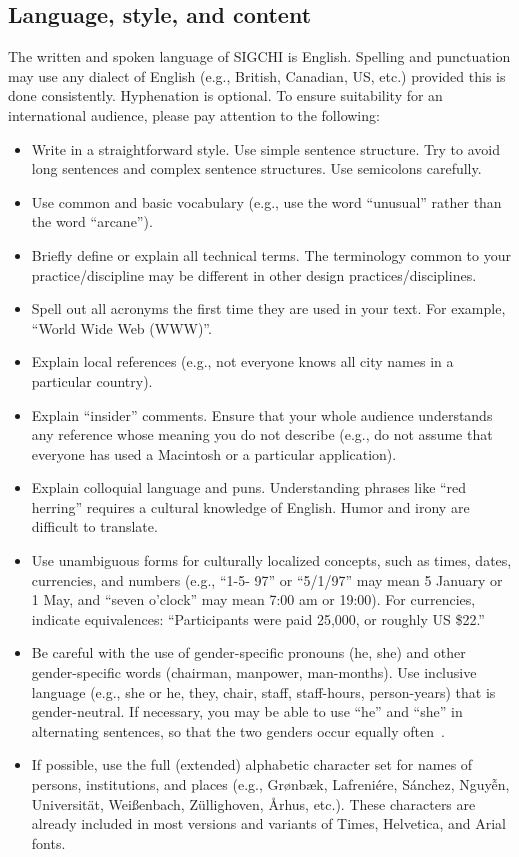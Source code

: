 \documentclass[sigchi-a, authorversion]{acmart}
\begin{document}
\subsection{Language, style, and content}
The written and spoken language of SIGCHI is English. Spelling and
punctuation may use any dialect of English (e.g., British, Canadian,
US, etc.) provided this is done consistently. Hyphenation is
optional. To ensure suitability for an international audience, please
pay attention to the following:
\begin{itemize}
\item Write in a straightforward style. Use simple sentence
  structure. Try to avoid long sentences and complex sentence
  structures. Use semicolons carefully.
\item Use common and basic vocabulary (e.g., use the word ``unusual''
  rather than the word ``arcane'').
\item Briefly define or explain all technical terms. The terminology
  common to your practice/discipline may be different in other design
  practices/disciplines.
\item Spell out all acronyms the first time they are used in your
  text. For example, ``World Wide Web (WWW)''.
\item Explain local references (e.g., not everyone knows all city
  names in a particular country).
\item Explain ``insider'' comments. Ensure that your whole audience
  understands any reference whose meaning you do not describe (e.g.,
  do not assume that everyone has used a Macintosh or a particular
  application).
\item Explain colloquial language and puns. Understanding phrases like
  ``red herring'' requires a cultural knowledge of English. Humor and
  irony are difficult to translate.
\item Use unambiguous forms for culturally localized concepts, such as
  times, dates, currencies, and numbers (e.g., ``1-5- 97'' or
  ``5/1/97'' may mean 5 January or 1 May, and ``seven o'clock'' may
  mean 7:00 am or 19:00). For currencies, indicate equivalences:
  ``Participants were paid {\selectfont \textwon}
  25,000, or roughly US \$22.''
\item Be careful with the use of gender-specific pronouns (he, she)
  and other gender-specific words (chairman, manpower,
  man-months). Use inclusive language (e.g., she or he, they, chair,
  staff, staff-hours, person-years) that is gender-neutral. If
  necessary, you may be able to use ``he'' and ``she'' in alternating
  sentences, so that the two genders occur equally
  often~\cite{Schwartz:1995:GBF}.
\item If possible, use the full (extended) alphabetic character set
  for names of persons, institutions, and places (e.g.,
  Gr{\o}nb{\ae}k, Lafreni\'ere, S\'anchez, Nguy{\~{\^{e}}}n,
  Universit{\"a}t, Wei{\ss}enbach, Z{\"u}llighoven, \r{A}rhus, etc.).
  These characters are already included in most versions and variants
  of Times, Helvetica, and Arial fonts.
\end{itemize}
\end{document}
